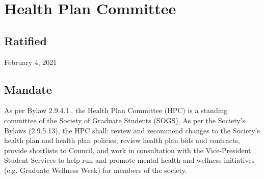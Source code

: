 \section{Health Plan Committee}

\subsection{Ratified}
February 4, 2021

\subsection{Mandate}
As per Bylaw 2.9.4.1., the Health Plan Committee (HPC) is a standing committee of the Society of Graduate Students (SOGS). As per the Society’s Bylaws (2.9.5.13), the HPC shall: review and recommend changes to the Society’s health plan and health plan policies, review health plan bids and contracts, provide shortlists to Council, and work in consultation with the Vice-President Student Services to help run and promote mental health and wellness initiatives (e.g. Graduate Wellness Week) for members of the society.

